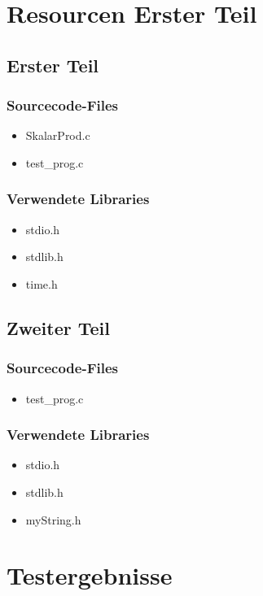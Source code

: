 \documentclass{scrartcl}
\begin{document}
\section{Resourcen Erster Teil}
\subsection{Erster Teil}
\subsubsection{Sourcecode-Files}
\begin{itemize}
\item SkalarProd.c
\item test\_prog.c
\end{itemize}

\subsubsection{Verwendete Libraries}
\begin{itemize}
\item stdio.h
\item stdlib.h
\item time.h
\end{itemize}

\subsection{Zweiter Teil}
\subsubsection{Sourcecode-Files}
\begin{itemize}
\item test\_prog.c
\end{itemize}

\subsubsection{Verwendete Libraries}
\begin{itemize}
\item stdio.h
\item stdlib.h
\item myString.h
\end{itemize}

\section{Testergebnisse}
\end{document}
